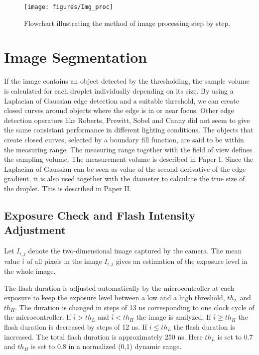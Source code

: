 \begin{figure}[ht]
\centering\texttt{[image: figures/Img\_proc]}
\caption{Flowchart illustrating the method of image processing step by step.}
\label{fig:img_proc}
\end{figure}

\section{Image Segmentation}
\label{imgsegment}

If the image contains an object detected by the thresholding, the sample volume is calculated for each droplet individually depending on its size. By using a Laplacian of Gaussian \cite{marr1980, gonz2002} edge detection and a suitable threshold, we can create closed curves around objects where the edge is in or near focus. Other edge detection operators like Roberts, Prewitt, Sobel \cite{gonz2002} and Canny \cite{canny1986} did not seem to give the same consistant performance in different lighting conditions. The objects that create closed curves, selected by a boundary fill function, are said to be within the measuring range. The measuring range together with the field of view defines the sampling volume. The measurement volume is described in Paper I. Since the Laplacian of Gaussian can be seen as value of the second derivative of the edge gradient, it is also used together with the diameter to calculate the true size of the droplet. This is described in Paper II.

\subsection{Exposure Check and Flash Intensity Adjustment}

Let $I_{i,j}$ denote the two-dimensional image captured by the camera. The mean value $\overline{i}$ of all pixels in the image $I_{i,j}$ gives an estimation of the exposure level in the whole image. 

The flash duration is adjusted automatically by the microcontroller at each exposure to keep the exposure level between a low and a high threshold, $th_L$ and $th_H$. The duration is changed in steps of 13 ns corresponding to one clock cycle of the microcontroller. If $\overline{i} > th_L$ and $\overline{i} < th_H$ the image is analyzed. If $\overline{i} \geq th_H$ the flash duration is decreased by steps of 12 ns. If $\overline{i} \leq th_L$ the flash duration is increased. The total flash duration is approximately 250 ns. Here $th_L$ is set to 0.7 and $th_H$ is set to 0.8 in a normalized (0,1) dynamic range.


